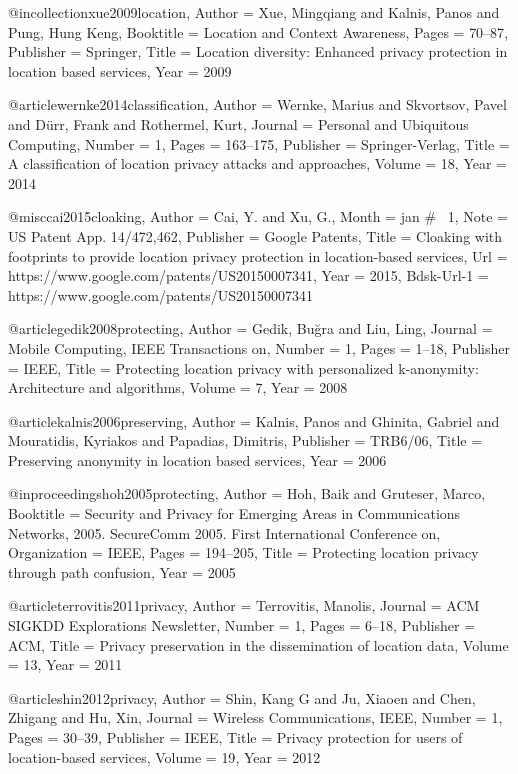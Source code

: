 {{{{{{{	@incollection{xue2009location,
	Author = {Xue, Mingqiang and Kalnis, Panos and Pung, Hung Keng},
	Booktitle = {Location and Context Awareness},
	Pages = {70--87},
	Publisher = {Springer},
	Title = {Location diversity: Enhanced privacy protection in location based services},
	Year = {2009}}
	
	@article{wernke2014classification,
	Author = {Wernke, Marius and Skvortsov, Pavel and D{\"u}rr, Frank and Rothermel, Kurt},
	Journal = {Personal and Ubiquitous Computing},
	Number = {1},
	Pages = {163--175},
	Publisher = {Springer-Verlag},
	Title = {A classification of location privacy attacks and approaches},
	Volume = {18},
	Year = {2014}}
	
	@misc{cai2015cloaking,
	Author = {Cai, Y. and Xu, G.},
	Month = jan # {~1},
	Note = {US Patent App. 14/472,462},
	Publisher = {Google Patents},
	Title = {Cloaking with footprints to provide location privacy protection in location-based services},
	Url = {https://www.google.com/patents/US20150007341},
	Year = {2015},
	Bdsk-Url-1 = {https://www.google.com/patents/US20150007341}}
	
	@article{gedik2008protecting,
	Author = {Gedik, Bu{\u{g}}ra and Liu, Ling},
	Journal = {Mobile Computing, IEEE Transactions on},
	Number = {1},
	Pages = {1--18},
	Publisher = {IEEE},
	Title = {Protecting location privacy with personalized k-anonymity: Architecture and algorithms},
	Volume = {7},
	Year = {2008}}
	
	@article{kalnis2006preserving,
	Author = {Kalnis, Panos and Ghinita, Gabriel and Mouratidis, Kyriakos and Papadias, Dimitris},
	Publisher = {TRB6/06},
	Title = {Preserving anonymity in location based services},
	Year = {2006}}
	
	@inproceedings{hoh2005protecting,
	Author = {Hoh, Baik and Gruteser, Marco},
	Booktitle = {Security and Privacy for Emerging Areas in Communications Networks, 2005. SecureComm 2005. First International Conference on},
	Organization = {IEEE},
	Pages = {194--205},
	Title = {Protecting location privacy through path confusion},
	Year = {2005}}
	
	@article{terrovitis2011privacy,
	Author = {Terrovitis, Manolis},
	Journal = {ACM SIGKDD Explorations Newsletter},
	Number = {1},
	Pages = {6--18},
	Publisher = {ACM},
	Title = {Privacy preservation in the dissemination of location data},
	Volume = {13},
	Year = {2011}}
	
	@article{shin2012privacy,
	Author = {Shin, Kang G and Ju, Xiaoen and Chen, Zhigang and Hu, Xin},
	Journal = {Wireless Communications, IEEE},
	Number = {1},
	Pages = {30--39},
	Publisher = {IEEE},
	Title = {Privacy protection for users of location-based services},
	Volume = {19},
	Year = {2012}}
	
}}}}}}}
